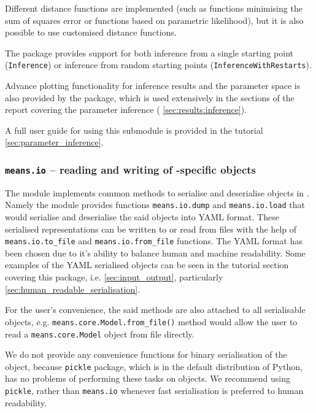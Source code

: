 Different distance functions are implemented (such as functions minimising the sum of squares error
or functions based on parametric likelihood), but it is also possible to use customised distance functions.

The package provides support for both inference from a single starting point (\verb"Inference")
or inference from random starting points (\verb"InferenceWithRestarts").

Advance plotting functionality for inference results and the parameter space is also provided by the package, which is used extensively in the sections of the report covering the parameter inference (\eg{} \autoref{sec:results:inference}). 

A full user guide for using this submodule is provided in the tutorial \autoref{sec:parameter_inference}.

\subsubsection{{\tt means.io} -- reading and writing of \means-specific objects}
The module implements common methods to serialise and deserialise objects in \means.
Namely the module provides functions \verb`means.io.dump` and  \verb`means.io.load` that would
serialise and deserialise the said objects into YAML format\cite{_official_????}.
These serialised representations can be written to or read from files with the help of
\verb`means.io.to_file` and \verb`means.io.from_file` functions.
The YAML format has been chosen due to it's ability to balance human and machine readability. 
Some examples of the YAML serialised objects can be seen in the tutorial section covering this package, i.e. \autoref{sec:input_output}, particularly \autoref{sec:human_readable_serialisation}.

For the user's convenience, the said methods are also attached to all serialisable objects,
e.g. \verb`means.core.Model.from_file()` method would allow the user to read a \verb`means.core.Model` object from file directly.

We do not provide any convenience functions for binary serialisation of the object, because \verb`pickle` package,
which is in the default distribution of Python, has no problems of performing these tasks on \means objects. 
We recommend using \verb`pickle`, rather than \verb`means.io` whenever fast serialisation is preferred to human
readability.

